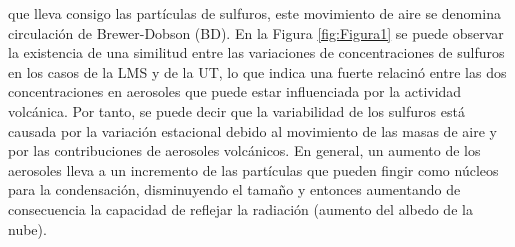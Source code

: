 \documentclass[a4apaper,twocolumn,10pt]{article}
\begin{document}
que lleva consigo las part\'iculas de sulfuros, este movimiento de aire se denomina circulaci\'on de Brewer-Dobson (BD). En la Figura \ref{fig:Figura1} se puede observar la existencia de una similitud entre las variaciones de concentraciones de sulfuros en los casos de la LMS y de la UT, lo que indica una fuerte relacin\'o entre las dos concentraciones en aerosoles que puede estar influenciada por la actividad volc\'anica. Por tanto, se puede decir que la variabilidad de los sulfuros est\'a causada por la variaci\'on estacional debido al movimiento de las masas de aire y por las contribuciones de aerosoles volc\'anicos. En general, un aumento de los aerosoles lleva a un incremento de las part\'iculas que pueden fingir como n\'ucleos para la condensaci\'on, disminuyendo el tama\~no y entonces aumentando de consecuencia la capacidad de reflejar la radiaci\'on (aumento del albedo de la nube).
\end{document}
